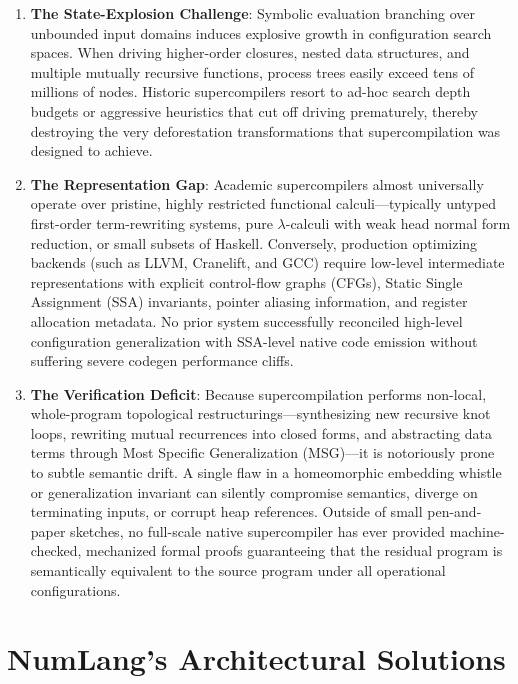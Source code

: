 \begin{enumerate}
    \item \textbf{The State-Explosion Challenge}: Symbolic evaluation branching over unbounded input domains induces explosive growth in configuration search spaces. When driving higher-order closures, nested data structures, and multiple mutually recursive functions, process trees easily exceed tens of millions of nodes. Historic supercompilers resort to ad-hoc search depth budgets or aggressive heuristics that cut off driving prematurely, thereby destroying the very deforestation transformations that supercompilation was designed to achieve.
    \item \textbf{The Representation Gap}: Academic supercompilers almost universally operate over pristine, highly restricted functional calculi---typically untyped first-order term-rewriting systems, pure $\lambda$-calculi with weak head normal form reduction, or small subsets of Haskell. Conversely, production optimizing backends (such as LLVM, Cranelift, and GCC) require low-level intermediate representations with explicit control-flow graphs (CFGs), Static Single Assignment (SSA) invariants, pointer aliasing information, and register allocation metadata. No prior system successfully reconciled high-level configuration generalization with SSA-level native code emission without suffering severe codegen performance cliffs.
    \item \textbf{The Verification Deficit}: Because supercompilation performs non-local, whole-program topological restructurings---synthesizing new recursive knot loops, rewriting mutual recurrences into closed forms, and abstracting data terms through Most Specific Generalization (MSG)---it is notoriously prone to subtle semantic drift. A single flaw in a homeomorphic embedding whistle or generalization invariant can silently compromise semantics, diverge on terminating inputs, or corrupt heap references. Outside of small pen-and-paper sketches, no full-scale native supercompiler has ever provided machine-checked, mechanized formal proofs guaranteeing that the residual program is semantically equivalent to the source program under all operational configurations.
\end{enumerate}

\section{NumLang's Architectural Solutions}
\label{sec:intro:solutions}

